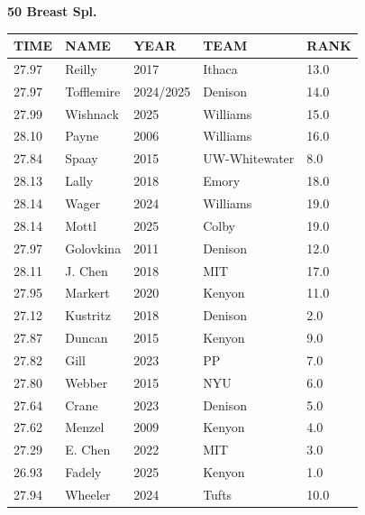 \begin{table}[H]
\centering
\begin{minipage}[t]{0.6\textwidth}
\centering
\textbf{50 Breast Spl.}\\[0.1cm]
\begin{tabular}{@{}p{1.8cm}p{2.8cm}p{1.2cm}p{1.4cm}p{0.8cm}@{}}
\hline
    \textbf{TIME} & \textbf{NAME} & \textbf{YEAR} & \textbf{TEAM} & \textbf{RANK} \\
\hline
    27.97 & Reilly & 2017 & Ithaca & 13.0 \\
    27.97 & Tofflemire & 2024/2025 & Denison & 14.0 \\
    27.99 & Wishnack & 2025 & Williams & 15.0 \\
    28.10 & Payne & 2006 & Williams & 16.0 \\
    27.84 & Spaay & 2015 & UW-Whitewater & 8.0 \\
    28.13 & Lally & 2018 & Emory & 18.0 \\
    28.14 & Wager & 2024 & Williams & 19.0 \\
    28.14 & Mottl & 2025 & Colby & 19.0 \\
    27.97 & Golovkina & 2011 & Denison & 12.0 \\
    28.11 & J. Chen & 2018 & MIT & 17.0 \\
    27.95 & Markert & 2020 & Kenyon & 11.0 \\
    27.12 & Kustritz & 2018 & Denison & 2.0 \\
    27.87 & Duncan & 2015 & Kenyon & 9.0 \\
    27.82 & Gill & 2023 & PP & 7.0 \\
    27.80 & Webber & 2015 & NYU & 6.0 \\
    27.64 & Crane & 2023 & Denison & 5.0 \\
    27.62 & Menzel & 2009 & Kenyon & 4.0 \\
    27.29 & E. Chen & 2022 & MIT & 3.0 \\
    26.93 & Fadely & 2025 & Kenyon & 1.0 \\
    27.94 & Wheeler & 2024 & Tufts & 10.0 \\
\hline
\end{tabular}
\end{minipage}
\end{table}


